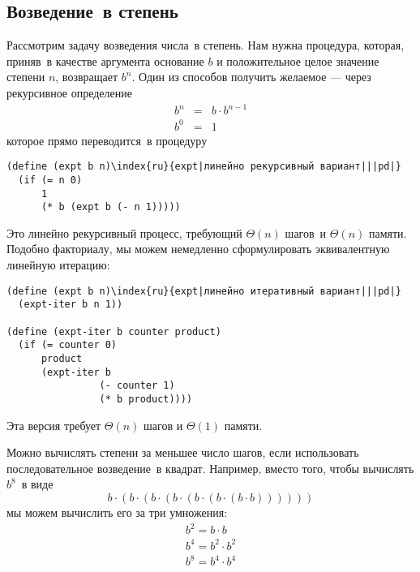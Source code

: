 \subsection{Возведение~в степень}
\label{EXPONENTIATION}


Рассмотрим задачу возведения числа~в степень.  Нам нужна
процедура, которая, приняв~в качестве аргумента основание $b$ 
и положительное целое значение степени $n$, возвращает
$b^n$.  Один из способов получить желаемое --- через
рекурсивное определение
$$
\begin{array}{rcl}
 b^n & = & b \cdot b^{n-1} \\
 b^0 & = & 1
\end{array}
$$
которое прямо переводится~в процедуру

\begin{Verbatim}[fontsize=\small]
(define (expt b n)\index{ru}{expt|линейно рекурсивный вариант|||pd|}
  (if (= n 0)
      1
      (* b (expt b (- n 1)))))
\end{Verbatim}
Это линейно рекурсивный процесс, требующий $\Theta(n)$
шагов~и $\Theta(n)$ памяти.  Подобно факториалу, мы можем
немедленно сформулировать эквивалентную линейную итерацию:

\begin{Verbatim}[fontsize=\small]
(define (expt b n)\index{ru}{expt|линейно итеративный вариант|||pd|}
  (expt-iter b n 1))

(define (expt-iter b counter product)
  (if (= counter 0)
      product
      (expt-iter b
                (- counter 1)
                (* b product)))) 
\end{Verbatim}
Эта версия требует $\Theta(n)$ шагов и
$\Theta(1)$ памяти.

Можно вычислять степени за меньшее число шагов, если
использовать 
последовательное возведение~в квадрат. Например, вместо
того, чтобы вычислять $b^8$~в виде
$$
b \cdot (b \cdot (b \cdot (b \cdot (b \cdot (b \cdot (b \cdot b))))))
$$
мы можем вычислить его за три умножения:
$$
\begin{array}{l}
 b^2 = b \cdot b \\
 b^4 = b^2 \cdot b^2 \\
 b^8 = b^4 \cdot b^4 \\
\end{array}
$$

